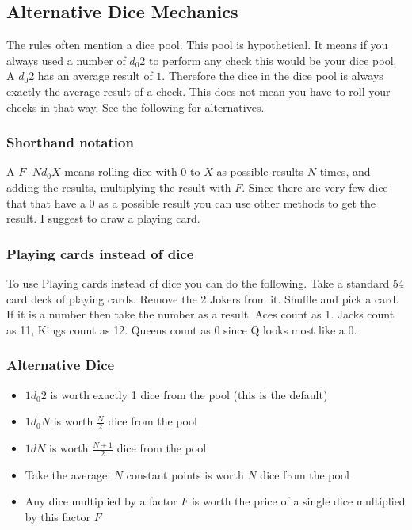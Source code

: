 \documentclass[11pt]{article}
\begin{document}
{\subsection{Alternative Dice Mechanics}
\label{sec:org13782c5}
The rules often mention a dice pool. This pool is hypothetical. It means if you always used a number of  \(d_0 2\) to perform any check this would be your dice pool. A \(d_0 2\) has an average result of \(1\). Therefore the dice in the dice pool is always exactly the average result of a check. This does not mean you have to roll your checks in that way. See the following for alternatives.

\subsubsection{Shorthand notation}
\label{sec:orgb09492c}

A \(F \cdot N d_0 X\) means rolling dice with \(0\) to \(X\) as possible results \(N\) times, and adding the results, multiplying the result with \(F\). Since there are very few dice that that have a 0 as a possible result you can use other methods to get the result. I suggest to draw a playing card.

\subsubsection{Playing cards instead of dice}
\label{sec:org8011b51}

To use Playing cards instead of dice you can do the following. Take a standard 54 card deck of playing cards. Remove the 2 Jokers from it. Shuffle and pick a card. If it is a number then take the number as a result. Aces count as 1. Jacks count as 11, Kings count as 12. Queens count as 0 since Q looks most like a 0.


\subsubsection{Alternative Dice}
\label{sec:org0825319}

\begin{itemize}
\item \(1 d_0 2\) is worth exactly 1 dice from the pool (this is the default)
\item \(1 d_0 N\) is worth \(\frac{N}{2}\) dice from the pool
\item \(1 d N\) is worth \(\frac{N+1}{2}\) dice from the pool
\item Take the average: \(N\) constant points is worth \(N\) dice from the pool
\item Any dice multiplied by a factor \(F\) is worth the price of a single dice multiplied by this factor \(F\)
\end{itemize}

}
\end{document}
